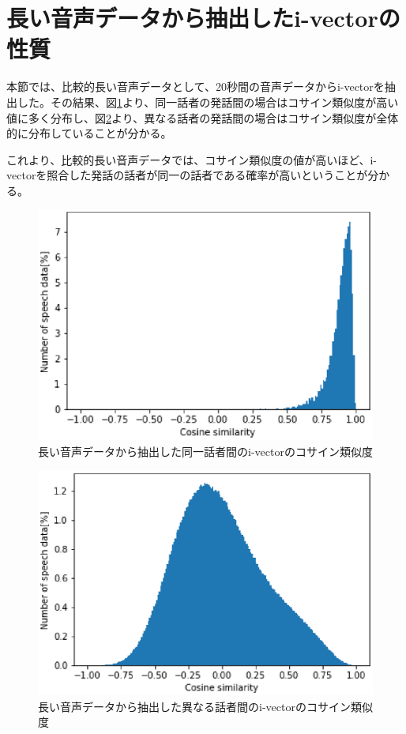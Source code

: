 \section{長い音声データから抽出したi-vectorの性質}
本節では、比較的長い音声データとして、20秒間の音声データからi-vectorを抽出した。その結果、図\ref{fig:iv_same_long}より、同一話者の発話間の場合はコサイン類似度が高い値に多く分布し、図\ref{fig:iv_other_long}より、異なる話者の発話間の場合はコサイン類似度が全体的に分布していることが分かる。\par
これより、比較的長い音声データでは、コサイン類似度の値が高いほど、i-vectorを照合した発話の話者が同一の話者である確率が高いということが分かる。

\begin{figure}[htb]
  \begin{center}
    \includegraphics{../../image/same_sp_long.eps}
  \end{center}
  \caption{長い音声データから抽出した同一話者間のi-vectorのコサイン類似度 \label{fig:iv_same_long}}
\end{figure}

\begin{figure}[htb]
  \begin{center}
    \includegraphics{../../image/other_sp_long.eps}
  \end{center}
  \caption{長い音声データから抽出した異なる話者間のi-vectorのコサイン類似度 \label{fig:iv_other_long}}
\end{figure}

